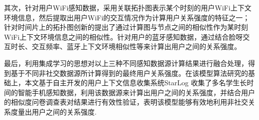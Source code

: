 \begin{cabstract}
\par 其次，针对用户WiFi感知数据，采用关联拓扑图表示某个时刻的用户WiFi上下文环境信息，然后提取出用户WiFi的交互情况作为计算用户关系强度的特征之一；针对时间片上的拓扑图创新的提出了通过计算图与节点之间的相似性作为某时刻WiFi上下文环境信息之间的相似性。针对用户的蓝牙感知数据，通过结合脸呀交互时长、交互频率、蓝牙上下文环境相似性等来计算出用户之间的关系强度。

\par 最后，利用集成学习的思想对以上三种不同感知数据源计算结果进行融合处理，得到基于不同非社交数据源所计算得到的最终用户关系强度。在该模型算法研究的基础上，本文基于自主开发的用户上下文信息收集系统StarLog 收集了多名学生长时间的智能手机感知数据，利用该数据源来计算出用户之间的关系强度，并结合用户的相似度问卷调查表对结果进行有效性验证，表明该模型能够有效地利用非社交关系度量出用户之间的关系强度.
\end{cabstract}

